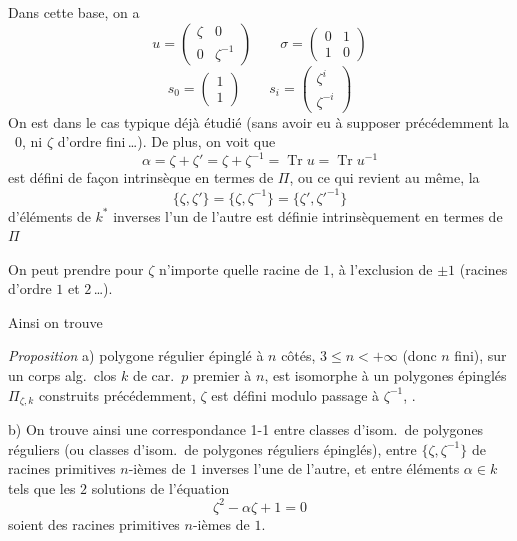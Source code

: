 \documentclass[11pt,a4paper]{article}
\begin{document}
Dans cette base, on a
\[
u = \begin{pmatrix} \zeta & 0 \\ 0 & \zeta^{-1} \end{pmatrix} \qquad
\sigma = \begin{pmatrix} 0 & 1 \\ 1 & 0 \end{pmatrix}
\]
\[
s_0 = \begin{pmatrix} 1 \\ 1 \end{pmatrix} \qquad
s_i = \begin{pmatrix} \zeta^{i} \\ \zeta^{-i} \end{pmatrix}
\]
On est dans le cas typique déjà étudié (sans avoir eu à supposer précédemment la \ $0$, ni $\zeta$ d'ordre fini\,…). De plus, on voit que
\[
\alpha = \zeta + \zeta' = \zeta + \zeta^{-1} = \operatorname{Tr} u = \operatorname{Tr} u^{-1}
\]
est défini de façon intrinsèque en termes de $\Pi$, ou ce qui revient au même, la  \struck{\ill{}} 
\[
\{\zeta, \zeta'\} = \{\zeta, \zeta^{-1}\} = \{\zeta', \zeta'^{-1}\}
\]
d'éléments de $k^{*}$ inverses l'un de l'autre est définie intrinsèquement en termes de $\Pi$

On peut prendre pour $\zeta$ n'importe quelle racine de $1$, à l'exclusion de $\pm 1$ (racines d'ordre $1$ et $2$\,…).

Ainsi on trouve

\emph{Proposition} a)  polygone régulier épinglé à $n$ côtés, $3 \leq n < +\infty$ (donc $n$ fini), sur un corps alg.\ clos $k$ de car.\ $p$ premier à $n$, est isomorphe à un  polygones épinglés $\Pi_{\zeta,k}$   construits précédemment,   $\zeta$ est défini modulo passage à $\zeta^{-1}$, \struck{\ill{}} .

b) On trouve ainsi une correspondance 1-1 entre classes d'isom.\ de polygones réguliers (ou  classes d'isom.\ de polygones réguliers épinglés), entre   $\{\zeta, \zeta^{-1}\}$ de racines primitives $n$-ièmes de $1$ inverses l'une de l'autre, et entre éléments $\alpha \in k$ tels que les $2$ solutions de l'équation
\[
\zeta^{2} - \alpha\zeta + 1 = 0
\]
soient des racines primitives $n$-ièmes de $1$.
\end{document}

